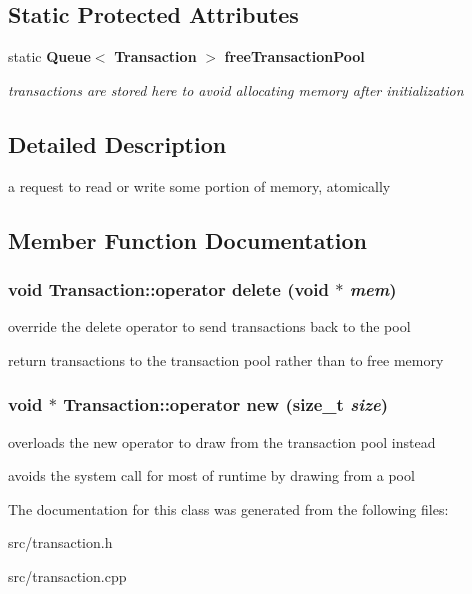 \subsection*{Static Protected Attributes}
\begin{CompactItemize}
\item 
static {\bf Queue}$<$ {\bf Transaction} $>$ {\bf freeTransactionPool}\label{class_d_r_a_msim_i_i_1_1_transaction_a607d2000268ce016d2f83eeb19e4c64}

\begin{CompactList}\small\item\em transactions are stored here to avoid allocating memory after initialization \item\end{CompactList}\end{CompactItemize}


\subsection{Detailed Description}
a request to read or write some portion of memory, atomically 

\subsection{Member Function Documentation}
\subsubsection[{operator delete}]{\setlength{\rightskip}{0pt plus 5cm}void Transaction::operator delete (void $\ast$ {\em mem})}\label{class_d_r_a_msim_i_i_1_1_transaction_4161098bb071135f21c2a7f95a6d5580}


override the delete operator to send transactions back to the pool 

return transactions to the transaction pool rather than to free memory 
\subsubsection[{operator new}]{\setlength{\rightskip}{0pt plus 5cm}void $\ast$ Transaction::operator new (size\_\-t {\em size})}\label{class_d_r_a_msim_i_i_1_1_transaction_d2b57bb609cc842f92e4319c555d3bf1}


overloads the new operator to draw from the transaction pool instead 

avoids the system call for most of runtime by drawing from a pool 

The documentation for this class was generated from the following files:\begin{CompactItemize}
\item 
src/transaction.h\item 
src/transaction.cpp\end{CompactItemize}
